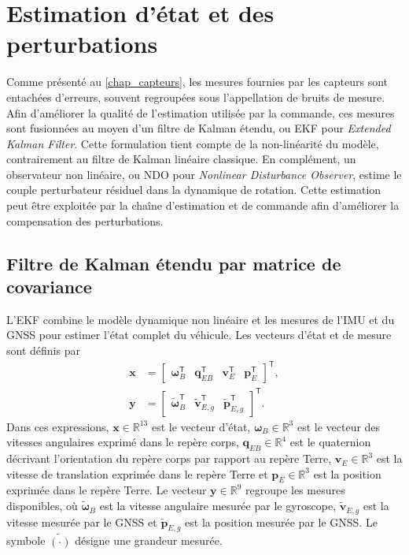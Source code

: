 \documentclass[11pt,a4paper,oneside]{report}
\newcommand{\vect}[1]{\bm{#1}}
\newcommand{\trans}{^{\mathsf T}}
\newcommand{\english}[1]{\textit{#1}}
\begin{document}
	\chapter{Estimation d'état et des perturbations}
	\label{chap_estimation}
	
	Comme présenté au \cref{chap_capteurs}, les mesures fournies par les capteurs sont entachées d'erreurs, souvent regroupées sous l'appellation de bruits de mesure. Afin d'améliorer la qualité de l'estimation utilisée par la commande, ces mesures sont fusionnées au moyen d'un filtre de Kalman étendu, ou EKF pour \english{Extended Kalman Filter}. Cette formulation tient compte de la non-linéarité du modèle, contrairement au filtre de Kalman linéaire classique.
	En complément, un observateur non linéaire, ou NDO pour \english{Nonlinear Disturbance Observer}, estime le couple perturbateur résiduel dans la dynamique de rotation. Cette estimation peut être exploitée par la chaîne d'estimation et de commande afin d'améliorer la compensation des perturbations.
	
	\section{Filtre de Kalman étendu par matrice de covariance}
L'EKF combine le modèle dynamique non linéaire et les mesures de l'IMU et du GNSS pour estimer l'état complet du véhicule. Les vecteurs d'état et de mesure sont définis par
\begin{subequations}
	\label{eq_ekf_vectors}
	\begin{align}
		\vect x&=\begin{bmatrix}\vect\omega_B\trans&\vect q_{EB}\trans&\vect v_E\trans&\vect p_E\trans\end{bmatrix}\trans,\\
		\vect y&=\begin{bmatrix}\tilde{\vect\omega}_B\trans&\tilde{\vect v}_{E,g}\trans&\tilde{\vect p}_{E,g}\trans\end{bmatrix}\trans.
	\end{align}
\end{subequations}
Dans ces expressions, $\vect x\in\mathbb{R}^{13}$ est le vecteur d'état, $\vect\omega_B\in\mathbb{R}^3$ est le vecteur des vitesses angulaires exprimé dans le repère corps, $\vect q_{EB}\in\mathbb{R}^4$ est le quaternion décrivant l'orientation du repère corps par rapport au repère Terre, $\vect v_E\in\mathbb{R}^3$ est la vitesse de translation exprimée dans le repère Terre et $\vect p_E\in\mathbb{R}^3$ est la position exprimée dans le repère Terre. Le vecteur $\vect y\in\mathbb{R}^9$ regroupe les mesures disponibles, où $\tilde{\vect\omega}_B$ est la vitesse angulaire mesurée par le gyroscope, $\tilde{\vect v}_{E,g}$ est la vitesse mesurée par le GNSS et $\tilde{\vect p}_{E,g}$ est la position mesurée par le GNSS. Le symbole $\tilde{(\cdot)}$ désigne une grandeur mesurée.
\end{document}

